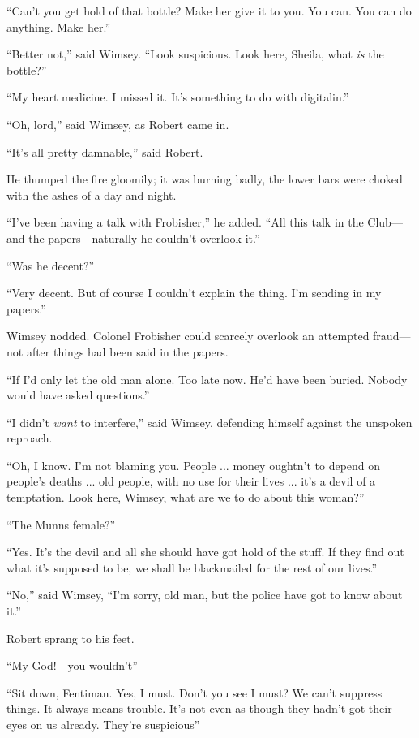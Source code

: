 \enquote{Can't you get hold of that bottle? Make her give it to you. You can. You can do anything. Make her.}

\enquote{Better not,} said Wimsey. \enquote{Look suspicious. Look here, Sheila, what \textit{is} the bottle?}

\enquote{My heart medicine. I missed it. It's something to do with digitalin.}

\enquote{Oh, lord,} said Wimsey, as Robert came in.

\enquote{It's all pretty damnable,} said Robert.

He thumped the fire gloomily; it was burning badly, the lower bars were choked with the ashes of a day and night.

\enquote{I've been having a talk with Frobisher,} he added. \enquote{All this talk in the Club\allowbreak---\allowbreak and the papers\allowbreak---\allowbreak naturally he couldn't overlook it.}

\enquote{Was he decent?}

\enquote{Very decent. But of course I couldn't explain the thing. I'm sending in my papers.}

Wimsey nodded. Colonel Frobisher could scarcely overlook an attempted fraud\allowbreak---\allowbreak not after things had been said in the papers.

\enquote{If I'd only let the old man alone. Too late now. He'd have been buried. Nobody would have asked questions.}

\enquote{I didn't \textit{want} to interfere,} said Wimsey, defending himself against the unspoken reproach.

\enquote{Oh, I know. I'm not blaming you. People ... money oughtn't to depend on people's deaths ... old people, with no use for their lives ... it's a devil of a temptation. Look here, Wimsey, what are we to do about this woman?}

\enquote{The Munns female?}

\enquote{Yes. It's the devil and all she should have got hold of the stuff. If they find out what it's supposed to be, we shall be blackmailed for the rest of our lives.}

\enquote{No,} said Wimsey, \enquote{I'm sorry, old man, but the police have got to know about it.}

Robert sprang to his feet.

\enquote{My God!---you wouldn't\longdash}

\enquote{Sit down, Fentiman. Yes, I must. Don't you see I must? We can't suppress things. It always means trouble. It's not even as though they hadn't got their eyes on us already. They're suspicious\longdash}

